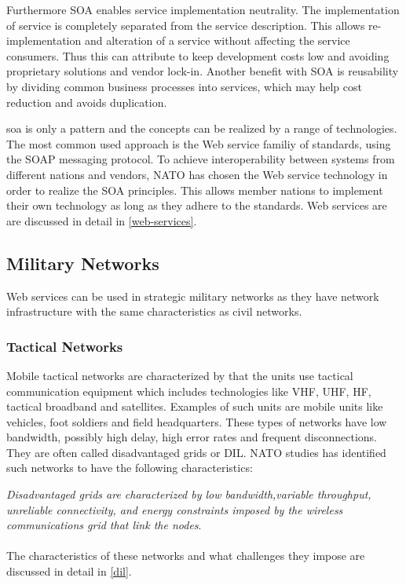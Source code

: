\documentclass[USenglish]{ifimaster}
\begin{document}
Furthermore SOA enables service implementation neutrality. The implementation of
service is completely separated from the service description. This allows
re-implementation and alteration of a service without affecting the service
consumers. Thus this can attribute to keep development costs low and avoiding
proprietary solutions and vendor lock-in. Another benefit with SOA is
reusability by dividing common business processes into services, which may help
cost reduction and avoids duplication.

\gls{soa} is only a pattern and the concepts can be realized by a range of
technologies. The most common used approach is the Web service familiy of
standards, using the SOAP messaging protocol. To achieve interoperability
between systems from different nations and vendors, NATO has chosen the Web
service technology in order to realize the SOA principles. This allows member
nations to implement their own technology as long as they adhere to the
standards. Web services are are discussed in detail in \cref{web-services}.

\subsection{Military Networks}
Web services can be used in strategic military networks as they have network
infrastructure with the same characteristics as civil networks.

\subsubsection{Tactical Networks}
Mobile tactical networks are characterized by that the units use tactical
communication equipment which includes technologies like VHF, UHF, HF,
tactical broadband and satellites. Examples of such units are mobile units
like vehicles, foot soldiers and field headquarters. These types of networks
have low bandwidth, possibly high delay, high error rates and frequent
disconnections. They are often called disadvantaged grids or DIL. NATO studies
has identified such networks to have the following characteristics:

\textit{
Disadvantaged grids are characterized by low bandwidth,variable throughput,
unreliable connectivity, and energy constraints imposed by the wireless
communications grid that link the nodes}\cite{nato-disadvantaged-grids}.
\paragraph{}
The characteristics of these networks and what challenges they impose are
discussed in detail in \cref{dil}.
\end{document}
